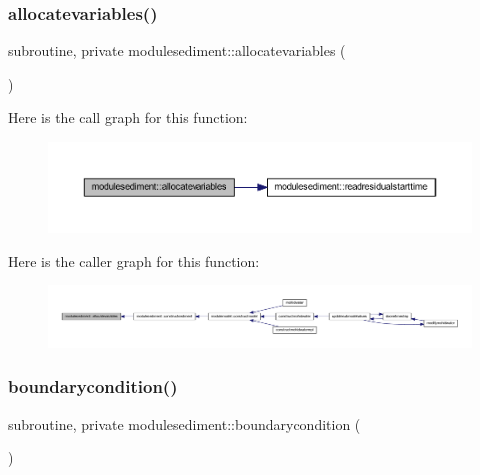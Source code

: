 \subsubsection{\texorpdfstring{allocatevariables()}{allocatevariables()}}
{\footnotesize\ttfamily subroutine, private modulesediment\+::allocatevariables (\begin{DoxyParamCaption}{ }\end{DoxyParamCaption})\hspace{0.3cm}{\ttfamily [private]}}

Here is the call graph for this function\+:\nopagebreak
\begin{figure}[H]
\begin{center}
\leavevmode
\includegraphics[width=350pt]{namespacemodulesediment_a7feb9a14efb0c8cc97dfc870ff9804ce_cgraph}
\end{center}
\end{figure}
Here is the caller graph for this function\+:\nopagebreak
\begin{figure}[H]
\begin{center}
\leavevmode
\includegraphics[width=350pt]{namespacemodulesediment_a7feb9a14efb0c8cc97dfc870ff9804ce_icgraph}
\end{center}
\end{figure}
\mbox{\label{namespacemodulesediment_a3b2c4d5436d7504be300368e5a584c64}} 
\subsubsection{\texorpdfstring{boundarycondition()}{boundarycondition()}}
{\footnotesize\ttfamily subroutine, private modulesediment\+::boundarycondition (\begin{DoxyParamCaption}{ }\end{DoxyParamCaption})\hspace{0.3cm}{\ttfamily [private]}}

